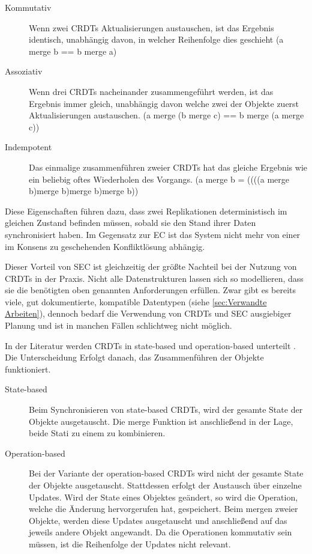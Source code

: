 \documentclass[a4paper, 12pt]{scrreprt}
\begin{document}
\begin{description}
	\item[Kommutativ] Wenn zwei CRDTs Aktualisierungen austauschen, ist das Ergebnis identisch, unabhängig davon, in welcher Reihenfolge dies geschieht (a merge b == b merge a)
	\item[Assoziativ] Wenn drei CRDTs nacheinander zusammengeführt werden, ist das Ergebnis immer gleich, unabhängig davon welche zwei der Objekte zuerst Aktualisierungen austauschen. (a merge (b merge c) == b merge (a merge c))
	\item[Indempotent] Das einmalige zusammenführen zweier CRDTs hat das gleiche Ergebnis wie ein beliebig oftes Wiederholen des Vorgangs. (a merge b = ((((a merge b)merge b)merge b)merge b))
\end{description}

Diese Eigenschaften führen dazu, dass zwei Replikationen deterministisch im gleichen Zustand befinden müssen, sobald sie den Stand ihrer Daten synchronisiert haben. Im Gegensatz zur \ac{EC} ist das System nicht mehr von einer im Konsens zu geschehenden Konfliktlösung abhängig. 

Dieser Vorteil von \ac{SEC} ist gleichzeitig der größte Nachteil bei der Nutzung von CRDTs in der Praxis. Nicht alle Datenstrukturen lassen sich so modellieren, dass sie die benötigten oben genannten Anforderungen erfüllen. Zwar gibt es bereits viele, gut dokumentierte, kompatible Datentypen (siehe \ref{sec:Verwandte Arbeiten}), dennoch bedarf die Verwendung von CRDTs und \ac{SEC} ausgiebiger Planung und ist in manchen Fällen schlichtweg nicht möglich. 

In der Literatur werden CRDTs in state-based und operation-based unterteilt \autocite[S. 10]{ArticleOptimisticReplication}. Die Unterscheidung Erfolgt danach, das Zusammenführen der Objekte funktioniert.

\begin{description}
	\item[State-based]
	Beim Synchronisieren von state-based CRDTs, wird der gesamte State der Objekte ausgetauscht.
	Die merge Funktion ist anschließend in der Lage, beide Stati zu einem zu kombinieren. 
	
	\item[Operation-based]
	Bei der Variante der operation-based CRDTs wird nicht der gesamte State der Objekte ausgetauscht. Stattdessen erfolgt der Austausch über einzelne Updates. Wird der State eines Objektes geändert, so wird die Operation, welche die Änderung hervorgerufen hat, gespeichert. Beim mergen zweier Objekte, werden diese Updates ausgetauscht und anschließend auf das jeweils andere Objekt angewandt. Da die Operationen kommutativ sein müssen,
	ist die Reihenfolge der Updates nicht relevant. 
\end{description} 
\end{document}

